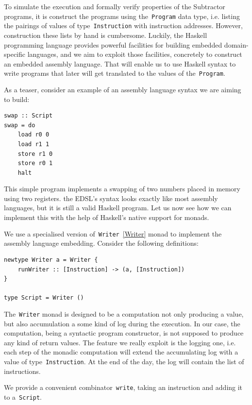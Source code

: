 To simulate the execution and formally verify properties of the Subtractor programs,
it is construct the programs using the~\texttt{Program} data type, i.e.
listing the pairings of values of type~\texttt{Instruction} with instruction addresses.
However, construction these lists by hand is cumbersome. Luckily, the Haskell programming
language provides powerful facilities for building embedded domain-specific languages, and
we aim to exploit those facilities, concretely  to construct an embedded assembly language.
That will enable us to use Haskell syntax to write programs that later will get translated
to the values of the~\texttt{Program}.

As a teaser, consider an example of an assembly language syntax we are aiming to build:

\begin{verbatim}
swap :: Script
swap = do
    load r0 0
    load r1 1
    store r1 0
    store r0 1
    halt
\end{verbatim}
\label{syntaxExample}

This simple program implements a swapping of two numbers placed in memory using two
registers. the EDSL's syntax looks exactly like most assembly languages, but it
is still a valid Haskell program. Let us now see how we can implement this with
the help of Haskell's native support for monads.

We use a specialised version of~\texttt{Writer}~\ref{Writer} monad
to implement the assembly language embedding. Consider the following definitions:

\begin{verbatim}
newtype Writer a = Writer {
    runWriter :: [Instruction] -> (a, [Instruction])
}

type Script = Writer ()
\end{verbatim}

The~\texttt{Writer} monad is designed to be a computation not only
producing a value, but also accumulation a some kind of log during the execution.
In our case, the computation, being a syntactic program constructor, is not supposed
to produce any kind of return values. The feature we really exploit is the logging one,
i.e. each step of the monadic computation will extend the accumulating log with a
value of type~\texttt{Instruction}. At the end of the day, the log will
contain the list of instructions.

We provide a convenient combinator~\texttt{write}, taking an instruction
and adding it to a~\texttt{Script}.

